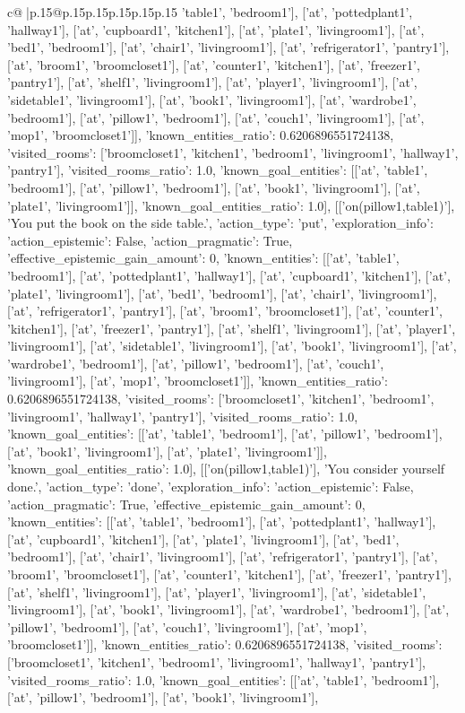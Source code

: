 \documentclass{article}
\begin{document}
{\begin{supertabular}{c@{$\;$}|p{.15\linewidth}@{}p{.15\linewidth}p{.15\linewidth}p{.15\linewidth}p{.15\linewidth}p{.15\linewidth}}
{{{'table1', 'bedroom1'], ['at', 'pottedplant1', 'hallway1'], ['at', 'cupboard1', 'kitchen1'], ['at', 'plate1', 'livingroom1'], ['at', 'bed1', 'bedroom1'], ['at', 'chair1', 'livingroom1'], ['at', 'refrigerator1', 'pantry1'], ['at', 'broom1', 'broomcloset1'], ['at', 'counter1', 'kitchen1'], ['at', 'freezer1', 'pantry1'], ['at', 'shelf1', 'livingroom1'], ['at', 'player1', 'livingroom1'], ['at', 'sidetable1', 'livingroom1'], ['at', 'book1', 'livingroom1'], ['at', 'wardrobe1', 'bedroom1'], ['at', 'pillow1', 'bedroom1'], ['at', 'couch1', 'livingroom1'], ['at', 'mop1', 'broomcloset1']], 'known_entities_ratio': 0.6206896551724138, 'visited_rooms': ['broomcloset1', 'kitchen1', 'bedroom1', 'livingroom1', 'hallway1', 'pantry1'], 'visited_rooms_ratio': 1.0, 'known_goal_entities': [['at', 'table1', 'bedroom1'], ['at', 'pillow1', 'bedroom1'], ['at', 'book1', 'livingroom1'], ['at', 'plate1', 'livingroom1']], 'known_goal_entities_ratio': 1.0}}], [['on(pillow1,table1)'], 'You put the book on the side table.', {'action_type': 'put', 'exploration_info': {'action_epistemic': False, 'action_pragmatic': True, 'effective_epistemic_gain_amount': 0, 'known_entities': [['at', 'table1', 'bedroom1'], ['at', 'pottedplant1', 'hallway1'], ['at', 'cupboard1', 'kitchen1'], ['at', 'plate1', 'livingroom1'], ['at', 'bed1', 'bedroom1'], ['at', 'chair1', 'livingroom1'], ['at', 'refrigerator1', 'pantry1'], ['at', 'broom1', 'broomcloset1'], ['at', 'counter1', 'kitchen1'], ['at', 'freezer1', 'pantry1'], ['at', 'shelf1', 'livingroom1'], ['at', 'player1', 'livingroom1'], ['at', 'sidetable1', 'livingroom1'], ['at', 'book1', 'livingroom1'], ['at', 'wardrobe1', 'bedroom1'], ['at', 'pillow1', 'bedroom1'], ['at', 'couch1', 'livingroom1'], ['at', 'mop1', 'broomcloset1']], 'known_entities_ratio': 0.6206896551724138, 'visited_rooms': ['broomcloset1', 'kitchen1', 'bedroom1', 'livingroom1', 'hallway1', 'pantry1'], 'visited_rooms_ratio': 1.0, 'known_goal_entities': [['at', 'table1', 'bedroom1'], ['at', 'pillow1', 'bedroom1'], ['at', 'book1', 'livingroom1'], ['at', 'plate1', 'livingroom1']], 'known_goal_entities_ratio': 1.0}}], [['on(pillow1,table1)'], 'You consider yourself done.', {'action_type': 'done', 'exploration_info': {'action_epistemic': False, 'action_pragmatic': True, 'effective_epistemic_gain_amount': 0, 'known_entities': [['at', 'table1', 'bedroom1'], ['at', 'pottedplant1', 'hallway1'], ['at', 'cupboard1', 'kitchen1'], ['at', 'plate1', 'livingroom1'], ['at', 'bed1', 'bedroom1'], ['at', 'chair1', 'livingroom1'], ['at', 'refrigerator1', 'pantry1'], ['at', 'broom1', 'broomcloset1'], ['at', 'counter1', 'kitchen1'], ['at', 'freezer1', 'pantry1'], ['at', 'shelf1', 'livingroom1'], ['at', 'player1', 'livingroom1'], ['at', 'sidetable1', 'livingroom1'], ['at', 'book1', 'livingroom1'], ['at', 'wardrobe1', 'bedroom1'], ['at', 'pillow1', 'bedroom1'], ['at', 'couch1', 'livingroom1'], ['at', 'mop1', 'broomcloset1']], 'known_entities_ratio': 0.6206896551724138, 'visited_rooms': ['broomcloset1', 'kitchen1', 'bedroom1', 'livingroom1', 'hallway1', 'pantry1'], 'visited_rooms_ratio': 1.0, 'known_goal_entities': [['at', 'table1', 'bedroom1'], ['at', 'pillow1', 'bedroom1'], ['at', 'book1', 'livingroom1'], }}}
\end{supertabular}}
\end{document}
